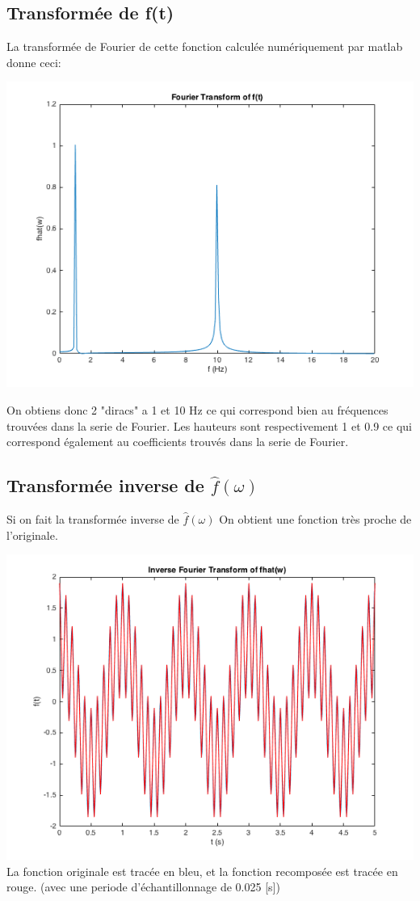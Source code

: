 \documentclass[a4paper,11pt]{article}
\begin{document}
\subsection{Transformée de f(t)}
La transformée de Fourier de cette fonction calculée numériquement par matlab donne ceci: \newline
\begin{center}
\includegraphics[scale=0.6]{"fhat.png"} \newline
\end{center}
On obtiens donc 2 "diracs" a 1 et 10 Hz ce qui correspond bien au fréquences trouvées dans la serie de Fourier. Les hauteurs sont respectivement 1 et 0.9 ce qui correspond également au coefficients trouvés dans la serie de Fourier.

\subsection{Transformée inverse de $\hat{f}(\omega)$}
Si on fait la transformée inverse de $\hat{f}(\omega)$
On obtient une fonction très proche de l'originale.
\begin{center}
\includegraphics[scale=0.6]{"f_and_f_ifft.png"} \newline
La fonction originale est tracée en bleu, et la fonction recomposée est tracée en rouge. (avec une periode d'échantillonnage de 0.025 [s]) 
\end{center} 
\end{document}
